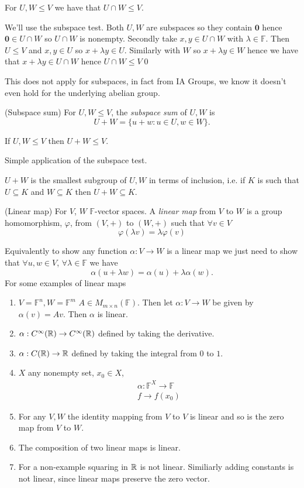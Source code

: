 \documentclass{article}
\newcommand{\F}{\mathbb{F}}
\begin{document}
\begin{lemma}
  For $ U,W\le V $ we have that $ U\cap W\le V $.
\end{lemma}
\pf We'll use the subspace test. Both $ U,W $ are subspaces so they contain $ \boldsymbol 0 $ hence $ \boldsymbol 0\in U\cap W $ so $ U\cap W $ is nonempty. Secondly take $ x,y\in U\cap W $ with $ \lambda \in \F $. Then $ U\le V $ and $ x,y\in U $ so $ x+\lambda y\in U $. Similarly with $ W $ so $ x+\lambda y \in W $ hence we have that $ x+\lambda y \in U \cap W $ hence $ U\cap W\le V $\qed
\begin{remark}
  This does not apply for subspaces, in fact from IA Groups, we know it doesn't even hold for the underlying abelian group.
\end{remark}
\begin{definition}
	(Subspace sum) For $ U,W\le V $, the \textit{subspace sum} of $ U, W $ is
	\[
		U+W=\{u+w:u\in U, w\in W\}.
	\]
\end{definition}
\begin{lemma}
  If $ U, W\le V $ then $ U+W\le V $.
\end{lemma}
\pf Simple application of the subspace test.
\begin{remark}
  $ U+W $ is the smallest subgroup of $ U, W $ in terms of inclusion, i.e. if $ K $ is such that $ U\subseteq K $ and $ W\subseteq K $ then $ U+W\subseteq K $.
\end{remark}
\begin{definition}
	(Linear map) For $ V $, $ W $ $ \F $-vector spaces. A \textit{linear map} from $ V $ to $ W $ is a group homomorphism, $ \varphi $, from $ (V,+) $ to $ (W,+) $ such that $ \forall v\in V $
	\[
	  \varphi(\lambda v) = \lambda\varphi(v)
	\]
\end{definition}
Equivalently to show any function $\alpha: V\to W $ is a linear map we just need to show that $ \forall u,w\in V $, $ \forall \lambda \in\F $ we have
\[
  \alpha(u+\lambda w)=\alpha(u)+\lambda\alpha(w).
\]
For some examples of linear maps
\begin{enumerate}
	\item $ V=\F^n, W=\F^m $ $ A\in M_{m\times n}(\F) $. Then let $ \alpha:V\to W $ be given by $ \alpha(v)=Av $. Then $ \alpha $ is linear.
	\item $ \alpha:C^\infty(\mathbb{R})\to C^\infty(\mathbb{R}) $ defined by taking the derivative.
	\item $ \alpha: C(\mathbb{R})\to \mathbb{R} $ defined by taking the integral from $ 0 $ to $ 1 $.
	\item $ X $ any nonempty  set, $ x_0\in X $,
		\begin{align*}
		  \alpha:\F^X\to \F \\
		  f\to f(x_0)
		\end{align*}
	\item For any $ V,W $ the identity mapping from $ V $ to $ V $ is linear and so is the zero map from $ V $ to $ W $.
	\item The composition of two linear maps is linear.
	\item For a non-example squaring in $ \mathbb{R} $ is not linear. Similiarly adding constants is not linear, since linear maps preserve the zero vector.
\end{enumerate}
\end{document}

